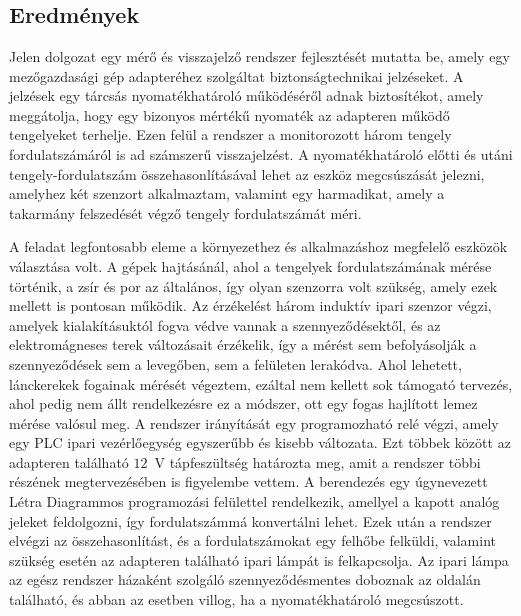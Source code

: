 \chapter{\osszefoglalas} %

\section{Eredmények}

Jelen dolgozat egy mérő és visszajelző rendszer fejlesztését mutatta be, amely egy mezőgazdasági gép adapteréhez szolgáltat biztonságtechnikai jelzéseket. A jelzések egy tárcsás nyomatékhatároló működéséről adnak biztosítékot, amely meggátolja, hogy egy bizonyos mértékű nyomaték az adapteren működő tengelyeket terhelje. Ezen felül a rendszer a monitorozott három tengely fordulatszámáról is ad számszerű visszajelzést. A nyomatékhatároló előtti és utáni tengely-fordulatszám összehasonlításával lehet az eszköz megcsúszását jelezni, amelyhez két szenzort alkalmaztam, valamint egy harmadikat, amely a takarmány felszedését végző tengely fordulatszámát méri.

A feladat legfontosabb eleme a környezethez és alkalmazáshoz megfelelő eszközök választása volt. A gépek hajtásánál, ahol a tengelyek fordulatszámának mérése történik, a zsír és por az általános, így olyan szenzorra volt szükség, amely ezek mellett is pontosan működik. Az érzékelést három induktív ipari szenzor végzi, amelyek kialakításuktól fogva védve vannak a szennyeződésektől, és az elektromágneses terek változásait érzékelik, így a mérést sem befolyásolják a szennyeződések sem a levegőben, sem a felületen lerakódva. Ahol lehetett, lánckerekek fogainak mérését végeztem, ezáltal nem kellett sok támogató tervezés, ahol pedig nem állt rendelkezésre ez a módszer, ott egy fogas hajlított lemez mérése valósul meg. A rendszer irányítását egy programozható relé végzi, amely egy PLC ipari vezérlőegység egyszerűbb és kisebb változata. Ezt többek között az adapteren található $12$~V tápfeszültség határozta meg, amit a rendszer többi részének megtervezésében is figyelembe vettem. A berendezés egy úgynevezett Létra Diagrammos programozási felülettel rendelkezik, amellyel a kapott analóg jeleket feldolgozni, így fordulatszámmá konvertálni lehet. Ezek után a rendszer elvégzi az összehasonlítást, és a fordulatszámokat egy felhőbe felküldi, valamint szükség esetén az adapteren található ipari lámpát is felkapcsolja. Az ipari lámpa az egész rendszer házaként szolgáló szennyeződésmentes doboznak az oldalán található, és abban az esetben villog, ha a nyomatékhatároló megcsúszott.

